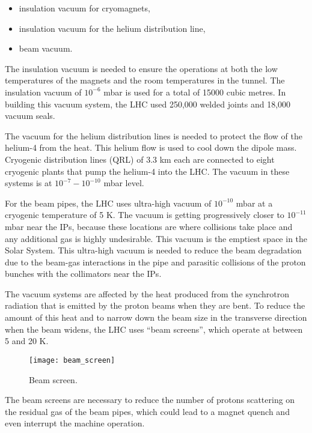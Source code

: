 \begin{normalsize}
\begin{itemize}
\item insulation vacuum for cryomagnets,
\item insulation vacuum for the helium distribution line,
\item beam vacuum.
\end{itemize}


The insulation vacuum is needed to ensure the operations at both the low temperatures of the magnets and the room temperatures in the tunnel. The insulation vacuum of $10^{-6}$ mbar is used for a total of 15000 cubic metres. In building this vacuum system, the LHC used 250,000 welded joints and 18,000 vacuum seals. 


The vacuum for the helium distribution lines is needed to protect the flow of the helium-4 from the heat. This helium flow is used to cool down the dipole mass. Cryogenic distribution lines (QRL) of 3.3 km each are connected to eight cryogenic plants that pump the helium-4 into the LHC. The vacuum in these systems is at $10^{-7}-10^{-10}$ mbar level. 



For the beam pipes, the LHC uses ultra-high vacuum of $10^{-10}$ mbar at a cryogenic temperature of 5 K. The vacuum is getting progressively closer to $10^{-11}$ mbar near the IPs, because these locations are where collisions take place and any additional gas is highly undesirable. This vacuum is the emptiest space in the Solar System. This ultra-high vacuum is needed to reduce the beam degradation due to the beam-gas interactions in the pipe and parasitic collisions of the proton bunches with the collimators near the IPs. 

The vacuum systems are affected by the heat produced from the synchrotron radiation that is emitted by the proton beams when they are bent. To reduce the amount of this heat and to narrow down the beam size in the transverse direction when the beam widens, the LHC uses ``beam screens'', which operate at between 5 and 20 K. 


\begin{figure}[H]
  \centering
  \texttt{[image: beam\_screen]}
  \caption{Beam screen.}\label{beam_screen}
\end{figure}



The beam screens are necessary to reduce the number of protons scattering on the residual gas of the beam pipes, which could lead to a magnet quench and even interrupt the machine operation. 


\end{normalsize}
